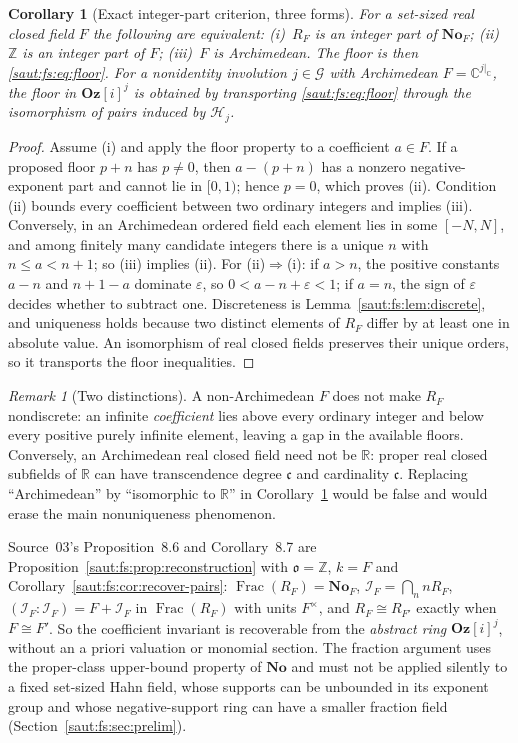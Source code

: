 \documentclass[11pt]{article}
\newtheorem{corollary}[theorem]{Corollary}
\theoremstyle{definition}
\theoremstyle{remark}
\newtheorem{remark}[theorem]{Remark}
\newcommand{\No}{\mathbf{No}}
\newcommand{\R}{\mathbb R}
\newcommand{\C}{\mathbb C}
\newcommand{\Z}{\mathbb Z}
\newcommand{\Oz}{\mathbf{Oz}}
\newcommand{\Frac}{\operatorname{Frac}}
\newcommand{\cc}{\mathfrak c}
\newcommand{\Ineg}{\mathcal I}
\numberwithin{equation}{section}
\begin{document}
\begin{corollary}[Exact integer-part criterion, three forms]\label{saut:gr:cor:ip}
For a set-sized real closed field $F$ the following are equivalent:
\textup{(i)}~$R_F$ is an integer part of $\No_F$; \textup{(ii)}~$\Z$ is an integer part
of $F$; \textup{(iii)}~$F$ is Archimedean. The floor is then \eqref{saut:fs:eq:floor}.
For a nonidentity involution $j\in\mathcal G$ with Archimedean $F=\C^{j|_\C}$, the floor
in $\Oz[i]^j$ is obtained by transporting \eqref{saut:fs:eq:floor} through the
isomorphism of pairs induced by $\mathcal H_j$.
\end{corollary}
\begin{proof}
Assume (i) and apply the floor property to a coefficient $a\in F$. If a proposed floor
$p+n$ has $p\ne0$, then $a-(p+n)$ has a nonzero negative-exponent part and cannot lie
in $[0,1)$; hence $p=0$, which proves (ii). Condition (ii) bounds every coefficient
between two ordinary integers and implies (iii). Conversely, in an Archimedean ordered
field each element lies in some $[-N,N]$, and among finitely many candidate integers
there is a unique $n$ with $n\le a<n+1$; so (iii) implies (ii). For (ii)$\Rightarrow$(i):
if $a>n$, the positive constants $a-n$ and $n+1-a$ dominate $\varepsilon$, so
$0<a-n+\varepsilon<1$; if $a=n$, the sign of $\varepsilon$ decides whether to subtract
one. Discreteness is Lemma~\ref{saut:fs:lem:discrete}, and uniqueness holds because two
distinct elements of $R_F$ differ by at least one in absolute value. An isomorphism of
real closed fields preserves their unique orders, so it transports the floor
inequalities.
\end{proof}

\begin{remark}[Two distinctions]\label{saut:gr:rem:arch}
A non-Archimedean $F$ does not make $R_F$ nondiscrete: an infinite \emph{coefficient}
lies above every ordinary integer and below every positive purely infinite element,
leaving a gap in the available floors. Conversely, an Archimedean real closed field
need not be $\R$: proper real closed subfields of $\R$ can have transcendence degree
$\cc$ and cardinality $\cc$. Replacing ``Archimedean'' by ``isomorphic to $\R$'' in
Corollary~\ref{saut:gr:cor:ip} would be false and would erase the main nonuniqueness
phenomenon.
\end{remark}

Source~03's Proposition~8.6 and Corollary~8.7 are
Proposition~\ref{saut:fs:prop:reconstruction} with $\mathfrak o=\Z$, $k=F$ and
Corollary~\ref{saut:fs:cor:recover-pairs}: $\Frac(R_F)=\No_F$, $\Ineg_F=\bigcap_nnR_F$,
$(\Ineg_F:\Ineg_F)=F+\Ineg_F$ in $\Frac(R_F)$ with units $F^\times$, and
$R_F\cong R_{F'}$ exactly when $F\cong F'$. So the coefficient invariant is recoverable
from the \emph{abstract ring} $\Oz[i]^j$, without an a priori valuation or monomial
section. The fraction argument uses the proper-class upper-bound property of $\No$ and
must not be applied silently to a fixed set-sized Hahn field, whose supports can be
unbounded in its exponent group and whose negative-support ring can have a smaller
fraction field (Section~\ref{saut:fs:sec:prelim}).
\end{document}
